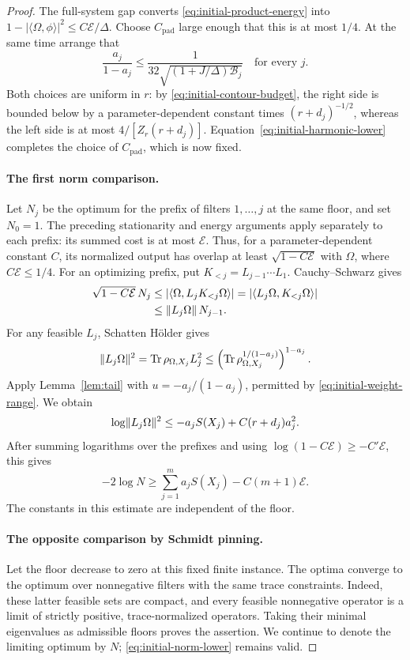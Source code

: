 \begin{proof}
The full-system gap converts \eqref{eq:initial-product-energy} into
$1-|\langle\Omega,\phi\rangle|^2\le C\mathcal E/\Delta$.
Choose $C_{\mathrm{pad}}$ large enough that this is at most $1/4$.
At the same time arrange that
\begin{equation}
 \frac{a_j}{1-a_j}
 \le\frac{1}{32\sqrt{(1+J/\Delta)\mathcal B_j}}
 \quad\text{for every }j.
 \label{eq:initial-weight-range}
\end{equation}
Both choices are uniform in $r$: by
\eqref{eq:initial-contour-budget}, the right side is bounded below
by a parameter-dependent constant times $(r+d_j)^{-1/2}$, whereas
the left side is at most $4/[Z_r(r+d_j)]$.
Equation~\eqref{eq:initial-harmonic-lower} completes the choice of
$C_{\mathrm{pad}}$, which is now fixed.

\paragraph{The first norm comparison.}
Let $N_j$ be the optimum for the prefix of filters $1,\ldots,j$ at the
same floor, and set $N_0=1$.  The preceding stationarity and energy
arguments apply separately to each prefix: its summed cost is at
most $\mathcal E$.  Thus, for a parameter-dependent constant $C$,
its normalized output has overlap at least
$\sqrt{1-C\mathcal E}$ with $\Omega$, where
$C\mathcal E\le1/4$.  For an optimizing prefix, put $K_{<j}=L_{j-1}\cdots L_1$.
Cauchy--Schwarz gives
\begin{align*}
 \sqrt{1-C\mathcal E}\,N_j
 &\le |\langle\Omega,L_jK_{<j}\Omega\rangle|
   =|\langle L_j\Omega,K_{<j}\Omega\rangle|\\
 &\le\lVert L_j\Omega\rVert\,N_{j-1}.
\end{align*}
For any feasible $L_j$, Schatten H\"older gives
\[
 \lVert L_j\Omega\rVert^2
 =\operatorname{Tr}\rho_{\Omega,X_j}L_j^2
 \le\left(\operatorname{Tr}\rho_{\Omega,X_j}^{1/(1-a_j)}\right)^{1-a_j}.
\]
Apply Lemma~\ref{lem:tail} with
$u=-a_j/(1-a_j)$, permitted by
\eqref{eq:initial-weight-range}.  We obtain
\[
 \log\lVert L_j\Omega\rVert^2
 \le-a_jS(X_j)+C(r+d_j)a_j^2.
\]
After summing logarithms over the prefixes and using
$\log(1-C\mathcal E)\ge-C'\mathcal E$, this gives
\begin{equation}
 -2\log N\ge\sum_{j=1}^m a_jS(X_j)-C(m+1)\mathcal E.
 \label{eq:initial-norm-lower}
\end{equation}
The constants in this estimate are independent of the floor.

\paragraph{The opposite comparison by Schmidt pinning.}
Let the floor decrease to zero at this fixed finite instance.
The optima converge to the optimum over nonnegative filters with the
same trace constraints.  Indeed, these latter feasible sets are
compact, and every feasible nonnegative operator is a limit of
strictly positive, trace-normalized operators.  Taking their minimal
eigenvalues as admissible floors proves the assertion.
We continue to denote the limiting optimum by $N$;
\eqref{eq:initial-norm-lower} remains valid.


\end{proof}
